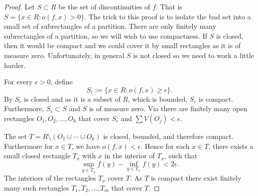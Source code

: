 \begin{proof}
Let $S \subset R$ be the set of discontinuities of $f$.  That is
$S = \{ x \in R : o(f,x) > 0 \}$.  The trick to this proof is to isolate the
bad set into a small set of subrectangles of a partition.  There are only
finitely many subrectangles of a partition, so we will wish to use
compactness.  If $S$ is closed, then it would be compact and we could cover
it by small rectangles as it is of measure zero.  Unfortunately, in general $S$
is not closed so we need to work a little harder.

For every $\epsilon > 0$, define
\begin{equation*}
S_\epsilon := \{ x \in R : o(f,x) \geq \epsilon \} .
\end{equation*}
By  $S_\epsilon$ is closed and as it is a subset of
$R$,
which is bounded, $S_\epsilon$ is compact.  Furthermore,
$S_\epsilon \subset S$ and $S$ is of measure zero.
Via  there are finitely many open rectangles
$O_1,O_2,\ldots,O_k$ that cover $S_\epsilon$ and
$\sum V(O_j) < \epsilon$.  

The set $T = R \setminus ( O_1 \cup \cdots \cup O_k )$ is closed, bounded,
and therefore compact.  Furthermore for $x \in T$, we have $o(f,x) <
\epsilon$.  Hence for each $x \in T$, there exists a small closed rectangle
$T_x$ with $x$ in the interior of $T_x$, such that
\begin{equation*}
\sup_{y\in T_x} f(y) - \inf_{y\in T_x} f(y) < 2\epsilon.
\end{equation*}
The interiors of the rectangles $T_x$ cover $T$.  As $T$ is compact
there exist finitely many such rectangles $T_1, T_2, \ldots, T_m$
that cover $T$.


\end{proof}
